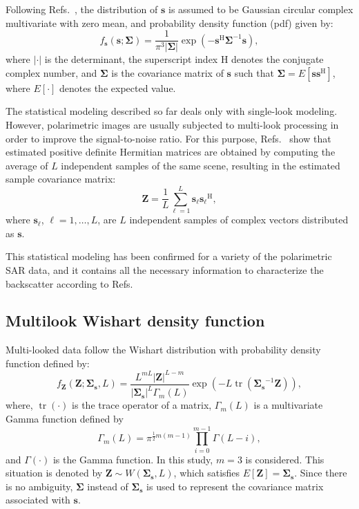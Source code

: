 \documentclass[conference]{IEEEtran}
\DeclareMathOperator{\traco}{tr}
\begin{document}
Following Refs.~\cite{good, lee}, the distribution of $\mathbf{s}$ is assumed to be  Gaussian circular complex multivariate with zero mean, and probability density function (pdf) given by:
\begin{equation}
    f_{\mathbf{s}}(\mathbf{s};\mathbf{\Sigma})=\frac{1}{\pi^3|\mathbf{\Sigma}|} \exp(-\mathbf{s}^\text{H}\mathbf{\Sigma}^{-1}\mathbf{s}),
    \label{eq_02}
\end{equation}
where $|\cdot|$ is the determinant, 
the superscript index $\text{H}$ denotes the conjugate complex number, 
and $\mathbf{\Sigma}$ is the covariance matrix of $\mathbf{s}$ such that $\mathbf{\Sigma}=E[\mathbf{ss}^\text{H}]$, where $E[\cdot]$ denotes the expected value. 
 
The statistical modeling described so far deals only with single-look modeling. However, polarimetric images are usually subjected to multi-look processing in order to improve the signal-to-noise ratio. 
For this purpose, Refs.~\cite{good, ade} show that estimated positive definite Hermitian matrices are obtained by computing the average of $L$ independent samples of the same scene, resulting in the estimated sample covariance matrix:
\begin{equation}
    \mathbf{Z}=\frac{1}{L}\sum_{\ell=1}^{L} {\mathbf{s}_\ell}{\mathbf{s}_\ell}^\text{H},
    \label{eq_03}
\end{equation}
where $\mathbf{s}_\ell$, $\ell = 1, \dots, L$, are $L$ independent samples of complex vectors distributed as $\mathbf{s}$.

This statistical modeling has been confirmed for a variety of the polarimetric SAR data, and it contains all the necessary information to characterize the backscatter according to Refs.~\cite{sarabendi,mfp}
\subsection{Multilook Wishart density function}

Multi-looked data follow the Wishart distribution with probability density function defined by:
\begin{equation}
    f_{\mathbf{Z}}(\mathbf{Z};\mathbf{\Sigma_{s}},L)=\frac{L^{mL}|\mathbf{Z}|^{L-m}}{|\mathbf{\Sigma_{s}}|^{L}\Gamma_m(L)} \exp(-L\traco(\mathbf{\Sigma_{s}}^{-1}\mathbf{Z})),
    \label{eq_04}
\end{equation} 
where, $\traco(\cdot)$ is the trace operator of a matrix, $\Gamma_m(L)$ is a multivariate Gamma function defined by
\begin{equation*}
	\Gamma_m(L)=\pi^{\frac{1}{2}m(m-1)} \prod_{i=0}^{m-1}\Gamma(L-i),
\end{equation*}
and $\Gamma(\cdot)$ is the Gamma function.
In this study, $m=3$ is considered. This situation is denoted by $\mathbf{Z}\sim W(\mathbf{\Sigma_{s}}, L)$, which satisfies $E[\mathbf{Z}]=\mathbf{\Sigma_{s}}$. 
Since there is no ambiguity, $\mathbf{\Sigma}$ instead of $\mathbf{\Sigma_{s}}$ is used  to represent the covariance matrix associated with $\mathbf{s}$.
\end{document}
